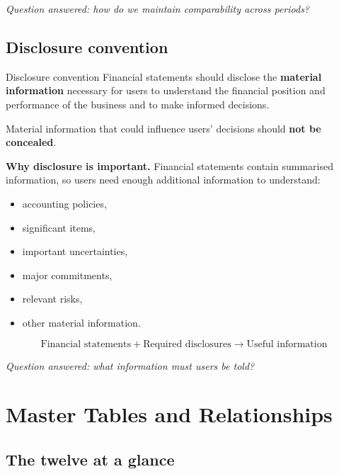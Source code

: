 \documentclass[11pt,a4paper]{article}
\begin{document}
\begin{keybox}
\emph{Question answered: how do we maintain comparability across periods?}
\end{keybox}

\subsection{Disclosure convention}

\begin{defbox}{Disclosure convention}
Financial statements should disclose the \textbf{material information} necessary for users to understand the
financial position and performance of the business and to make informed decisions.
\end{defbox}

Material information that could influence users' decisions should \textbf{not be concealed}.

\textbf{Why disclosure is important.} Financial statements contain summarised information, so users need enough
additional information to understand:

\begin{itemize}
  \item accounting policies,
  \item significant items,
  \item important uncertainties,
  \item major commitments,
  \item relevant risks,
  \item other material information.
\end{itemize}

\[
\boxed{\text{Financial statements}+\text{Required disclosures}\rightarrow\text{Useful information}}
\]

\begin{keybox}
\emph{Question answered: what information must users be told?}
\end{keybox}

\section{Master Tables and Relationships}

\subsection{The twelve at a glance}
\end{document}
